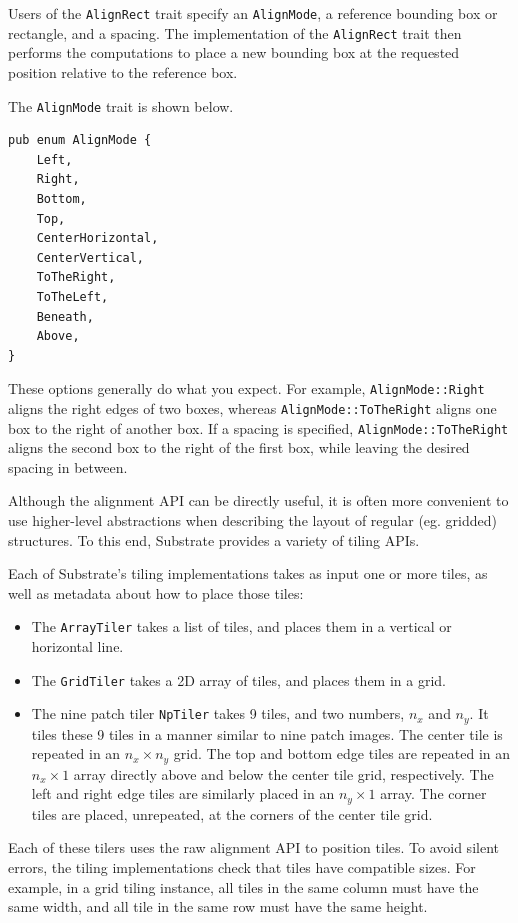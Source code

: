 Users of the \verb|AlignRect| trait specify an \verb|AlignMode|, a reference bounding box or rectangle,
and a spacing. The implementation of the \verb|AlignRect| trait then performs the computations to place
a new bounding box at the requested position relative to the reference box.

The \verb|AlignMode| trait is shown below.

\begin{verbatim}
pub enum AlignMode {
    Left,
    Right,
    Bottom,
    Top,
    CenterHorizontal,
    CenterVertical,
    ToTheRight,
    ToTheLeft,
    Beneath,
    Above,
}
\end{verbatim}

These options generally do what you expect. For example, \verb|AlignMode::Right| aligns the right edges of two boxes,
whereas \verb|AlignMode::ToTheRight| aligns one box to the right of another box.
If a spacing is specified, \verb|AlignMode::ToTheRight| aligns the second box to the right of the first box,
while leaving the desired spacing in between.

Although the alignment API can be directly useful,
it is often more convenient to use higher-level abstractions
when describing the layout of regular (eg. gridded) structures.
To this end, Substrate provides a variety of tiling APIs.

Each of Substrate's tiling implementations takes as input one or more tiles,
as well as metadata about how to place those tiles:
\begin{itemize}
\item The \verb|ArrayTiler| takes a list of tiles, and places them in a vertical or horizontal line.
\item The \verb|GridTiler| takes a 2D array of tiles, and places them in a grid.
\item The nine patch tiler \verb|NpTiler| takes 9 tiles, and two numbers, $n_x$ and $n_y$.
  It tiles these 9 tiles in a manner similar to nine patch images.
  The center tile is repeated in an $n_x \times n_y$ grid.
  The top and bottom edge tiles are repeated in an $n_x \times 1$ array
  directly above and below the center tile grid, respectively.
  The left and right edge tiles are similarly placed in an $n_y \times 1$ array.
  The corner tiles are placed, unrepeated, at the corners of the center tile grid.
\end{itemize}

Each of these tilers uses the raw alignment API to position tiles.
To avoid silent errors, the tiling implementations check that tiles have compatible sizes.
For example, in a grid tiling instance, all tiles in the same column must have the same width,
and all tile in the same row must have the same height.

